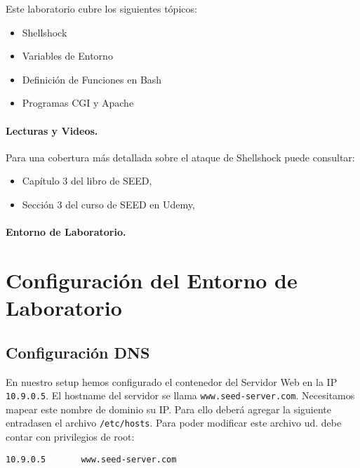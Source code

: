 Este laboratorio cubre los siguientes tópicos:

\begin{itemize}[noitemsep]
\item Shellshock
\item Variables de Entorno
\item Definición de Funciones en Bash
\item Programas CGI y Apache
\end{itemize}


\paragraph{Lecturas y Videos.}
Para una cobertura más detallada sobre el ataque de Shellshock puede consultar:
\begin{itemize}
\item Capítulo 3 del libro de SEED, \seedbook
\item Sección 3 del curso de SEED en Udemy, \seedcsvideo
\end{itemize}


\paragraph{Entorno de Laboratorio.} \seedenvironmentB \nodependency



\section{Configuración del Entorno de Laboratorio} 



\subsection{Configuración DNS}

En nuestro setup hemos configurado el contenedor del Servidor Web en la IP \texttt{10.9.0.5}. El hostname del servidor se llama \texttt{www.seed-server.com}.
Necesitamos mapear este nombre de dominio su IP. Para ello deberá agregar la siguiente entradasen el archivo \texttt{/etc/hosts}.
Para poder modificar este archivo ud. debe contar con privilegios de root:

\begin{lstlisting}
10.9.0.5       www.seed-server.com
\end{lstlisting}
 
